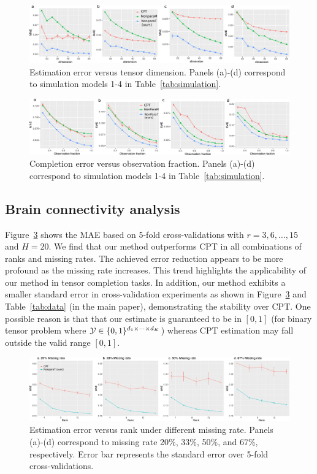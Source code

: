 \documentclass[11pt]{article}
\theoremstyle{plain}
\theoremstyle{definition}
\begin{document}
\begin{figure}[h!]
\includegraphics[width=\textwidth]{figure/fig1-4v2.pdf}
\caption{Estimation error versus tensor dimension. Panels (a)-(d) correspond to simulation models 1-4 in Table~\ref{tab:simulation}.}\label{fig:compare1}
\end{figure}


\begin{figure}[h!]
\includegraphics[width=\textwidth]{figure/fig5-8v2.pdf}
\caption{Completion error versus observation fraction. Panels (a)-(d) correspond to simulation models 1-4 in Table~\ref{tab:simulation}. }\label{fig:compare2}
\end{figure}


\subsection{Brain connectivity analysis}
Figure~\ref{fig:braincv} shows the MAE based on 5-fold cross-validations with $r = 3,6,\ldots, 15$ and $H = 20$. We find that our method outperforms CPT in all combinations of ranks and missing rates. The achieved error reduction appears to be more profound as the missing rate increases. This trend highlights the applicability of our method in tensor completion tasks. In addition, our method exhibits a smaller standard error in cross-validation experiments as shown in Figure~\ref{fig:braincv} and Table~\ref{tab:data} (in the main paper), demonstrating the stability over CPT.  One possible reason is that that our estimate is guaranteed to be in $[0,1]$ (for binary tensor problem where $\mathcal{Y}\in\{0,1\}^{d_1\times\cdots\times d_K}$) whereas CPT estimation may fall outside the valid range $[0,1]$. 

\begin{figure}[h!]
\includegraphics[width = \textwidth]{figure/brain_sim.pdf}
\caption{Estimation error versus rank under different missing rate. Panels (a)-(d) correspond to missing rate 20\%, 33\%, 50\%, and 67\%, respectively. Error bar represents the standard error over 5-fold cross-validations.}\label{fig:braincv}
\end{figure}
\end{document}
